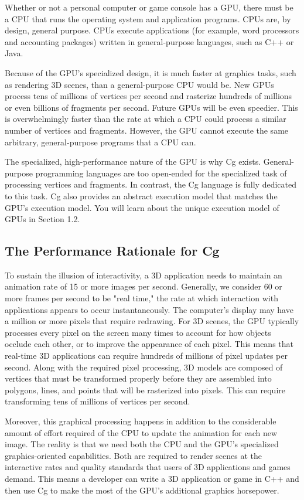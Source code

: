 \documentclass{book}
\begin{document}
Whether or not a personal computer or game console has a GPU, there must be a CPU that runs the operating system and application programs. CPUs are, by design, general purpose. CPUs execute applications (for example, word processors and accounting packages) written in general-purpose languages, such as C++ or Java.

Because of the GPU's specialized design, it is much faster at graphics tasks, such as rendering 3D scenes, than a general-purpose CPU would be. New GPUs process tens of millions of vertices per second and rasterize hundreds of millions or even billions of fragments per second. Future GPUs will be even speedier. This is overwhelmingly faster than the rate at which a CPU could process a similar number of vertices and fragments. However, the GPU cannot execute the same arbitrary, general-purpose programs that a CPU can.

The specialized, high-performance nature of the GPU is why Cg exists. General-purpose programming languages are too open-ended for the specialized task of processing vertices and fragments. In contrast, the Cg language is fully dedicated to this task. Cg also provides an abstract execution model that matches the GPU's execution model. You will learn about the unique execution model of GPUs in Section 1.2.

\subsection{The Performance Rationale for Cg}

To sustain the illusion of interactivity, a 3D application needs to maintain an animation rate of 15 or more images per second. Generally, we consider 60 or more frames per second to be "real time," the rate at which interaction with applications appears to occur instantaneously. The computer's display may have a million or more pixels that require redrawing. For 3D scenes, the GPU typically processes every pixel on the screen many times to account for how objects occlude each other, or to improve the appearance of each pixel. This means that real-time 3D applications can require hundreds of millions of pixel updates per second. Along with the required pixel processing, 3D models are composed of vertices that must be transformed properly before they are assembled into polygons, lines, and points that will be rasterized into pixels. This can require transforming tens of millions of vertices per second.

Moreover, this graphical processing happens in addition to the considerable amount of effort required of the CPU to update the animation for each new image. The reality is that we need both the CPU and the GPU's specialized graphics-oriented capabilities. Both are required to render scenes at the interactive rates and quality standards that users of 3D applications and games demand. This means a developer can write a 3D application or game in C++ and then use Cg to make the most of the GPU's additional graphics horsepower.
\end{document}
